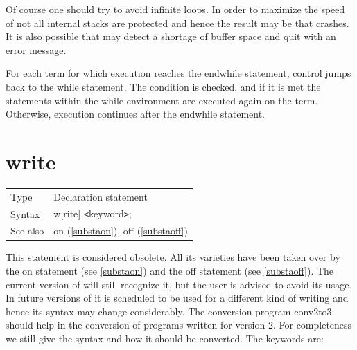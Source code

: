 Of course one should try to avoid infinite 
loops. In order to maximize the speed of {\FORM} not 
all internal stacks are protected and hence the result may be that {\FORM} 
crashes. It is also possible that {\FORM} may detect a shortage of buffer 
space and quit with an error message. \vspace{4mm}

\noindent For each term for which execution reaches the endwhile statement, 
control jumps back to the while statement. The condition is checked, and if
it is met the statements within the while environment are executed again on
the term. Otherwise, execution continues after the endwhile statement.
\vspace{10mm}


\section{write}
\label{substawrite}

\noindent \begin{tabular}{ll}
Type & Declaration statement\\
Syntax & w[rite] {\tt<}keyword{\tt>};
\\ See also & on (\ref{substaon}), off (\ref{substaoff})
\end{tabular} \vspace{4mm}

\noindent This statement is considered 
obsolete. All its varieties have been taken over by the 
on statement (see \ref{substaon}) and the off 
statement (see \ref{substaoff}). The current version of {\FORM} will still 
recognize it, but the user is advised to avoid its usage. In future 
versions of {\FORM} it is scheduled to be used for a different kind of 
writing and hence its syntax may change considerably. The conversion 
program conv2to3 should help in the conversion of programs written for 
version 2. For completeness we still give the syntax and how it should be 
converted. The keywords are: \vspace{4mm}
 

 
 
